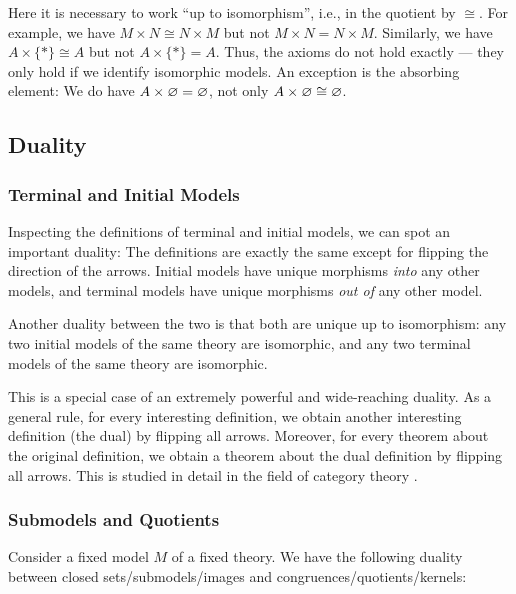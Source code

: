 Here it is necessary to work ``up to isomorphism'', i.e., in the quotient by $\cong$.
For example, we have $M\times N \cong N\times M$ but not $M\times N=N\times M$.
Similarly, we have $A\times \{\ast\}\cong A$ but not $A\times \{\ast\}=A$.
Thus, the axioms do not hold exactly --- they only hold if we identify isomorphic models.
An exception is the absorbing element: We do have $A\times \varnothing=\varnothing$, not only $A\times \varnothing\cong \varnothing$.

\subsection{Duality}\label{sec:univ:meta:dual}

\subsubsection{Terminal and Initial Models}\label{sec:univ:meta:terminit}

Inspecting the definitions of terminal and initial models, we can spot an important duality:
The definitions are exactly the same except for flipping the direction of the arrows.
Initial models have unique morphisms \emph{into} any other models, and terminal models have unique morphisms \emph{out of} any other model.

Another duality between the two is that both are unique up to isomorphism: any two initial models of the same theory are isomorphic, and any two terminal models of the same theory are isomorphic.

This is a special case of an extremely powerful and wide-reaching duality.
As a general rule, for every interesting definition, we obtain another interesting definition (the dual) by flipping all arrows.
Moreover, for every theorem about the original definition, we obtain a theorem about the dual definition by flipping all arrows.
This is studied in detail in the field of category theory \cite{categories,categories_awodey}.

\subsubsection{Submodels and Quotients}\label{sec:univ:meta:subquot}

Consider a fixed model $M$ of a fixed theory.
We have the following duality between closed sets/submodels/images and congruences/quotients/kernels:

